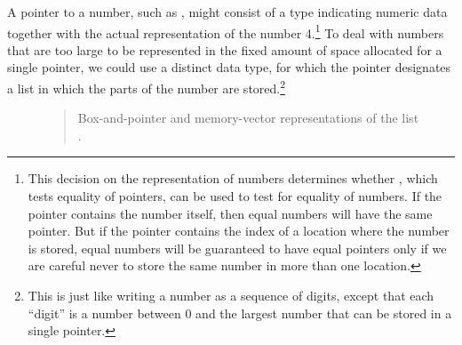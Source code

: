 A pointer to a number, such as , might consist of a type indicating
numeric data together with the actual representation of the number
4.\footnote{This decision on the representation of numbers determines whether
, which tests equality of pointers, can be used to test for equality
of numbers.  If the pointer contains the number itself, then equal numbers will
have the same pointer.  But if the pointer contains the index of a location
where the number is stored, equal numbers will be guaranteed to have equal
pointers only if we are careful never to store the same number in more than one
location.}  To deal with numbers that are too large to be represented in the
fixed amount of space allocated for a single pointer, we could use a distinct
 data type, for which the pointer designates a list in which
the parts of the number are stored.\footnote{This is just like writing a number
as a sequence of digits, except that each ``digit'' is a number between 0 and
the largest number that can be stored in a single pointer.}

\begin{figure}[tb]
\label{Figure 5.14}
\centering
\begin{comment}
\heading{Figure 5.14:} Box-and-pointer and memory-vector representations of the list \code{((1 2) 3 4)}.

\begin{example}
               +---+---+               +---+---+    +---+---+
((1 2) 3 4) -->| * | *-+-------------->| * | *-+--->| * | / |
               +-|-+---+               +-|-+---+    +-|-+---+
              1  |                    2  |         4  |
                 V                       V            V
               +---+---+    +---+---+  +---+        +---+
               | * | *-+--->| * | / |  | 3 |        | 4 |
               +-|-+---+    +-|-+---+  +---+        +---+
              5  |         7  |
                 V            V
               +---+        +---+
               | 1 |        | 2 |
               +---+        +---+

   Index   0    1    2    3    4    5    6    7    8    ...
         +----+----+----+----+----+----+----+----+----+----
the-cars |    | p5 | n3 |    | n4 | n1 |    | n2 |    | ...
         +----+----+----+----+----+----+----+----+----+----
the-cdrs |    | p2 | p4 |    | e0 | p7 |    | e0 |    | ...
         +----+----+----+----+----+----+----+----+----+----
\end{example}
\end{comment}

\begin{quote}
 Box-and-pointer and memory-vector representations of the list .
\end{quote}
\end{figure}

